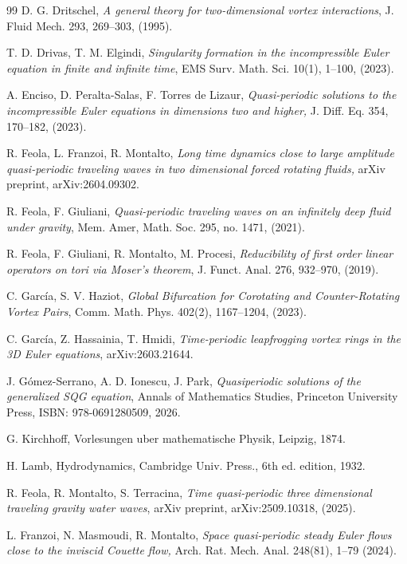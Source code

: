 \documentclass[a4paper,reqno,10pt]{article}
\begin{document}
\begin{thebibliography}{99}
    D. G. Dritschel, 
    {\it A general theory for two-dimensional vortex interactions},
    J. Fluid Mech. 293, 269--303, (1995).

    T. D. Drivas, T. M. Elgindi,
    {\it Singularity formation in the incompressible Euler equation in finite and infinite time}, 
    EMS Surv. Math. Sci. 10(1), 1--100, (2023).

      A. Enciso, D. Peralta-Salas, F. Torres de Lizaur, \textit{Quasi-periodic solutions to the incompressible Euler equations in dimensions two and higher,} 
     J.  Diff. Eq. 354, 170--182, (2023).

     R. Feola, L. Franzoi, R. Montalto, 
     \textit{Long time dynamics close to large amplitude quasi-periodic traveling waves in two dimensional forced rotating fluids,} 
     arXiv preprint,  arXiv:2604.09302.
	
	R. Feola, F.  Giuliani,
	{\it Quasi-periodic traveling waves on an infinitely deep fluid under gravity},
    Mem. Amer, Math. Soc. 295, no. 1471, (2021).
	
	
	R. Feola, F.  Giuliani, R.  Montalto, M. Procesi,
	{\it Reducibility of first order linear operators on tori via Moser's theorem},
	J. Funct. Anal. 276, 932--970, (2019).

    C. Garc\'ia, S. V. Haziot,
    \textit{Global Bifurcation for Corotating and Counter-Rotating Vortex Pairs},
    Comm. Math. Phys. 402(2), 1167--1204, (2023).

   C. Garc\'ia, Z. Hassainia, T. Hmidi, {\it Time-periodic leapfrogging vortex rings in the 3D Euler equations}, arXiv:2603.21644.
    
	 J. G\'omez-Serrano, A. D. Ionescu, J. Park, 
    {\it Quasiperiodic solutions of the generalized SQG equation}, 
    Annals of Mathematics Studies, Princeton University Press, 
    ISBN: 978-0691280509, 2026.


G. Kirchhoﬀ, 
Vorlesungen uber mathematische Physik, Leipzig, 1874.

H. Lamb, 
Hydrodynamics, 
Cambridge Univ. Press., 6th ed. edition, 1932.

	
	R. Feola, R. Montalto, S. Terracina, 
	{\it Time quasi-periodic three dimensional traveling gravity water waves},
	arXiv preprint, arXiv:2509.10318, (2025).

     L. Franzoi, N. Masmoudi, R. Montalto, 
     \textit{Space quasi-periodic steady Euler flows close to the inviscid Couette flow,} 
     Arch.  Rat. Mech. Anal. 248(81), 1--79 (2024).
	

\end{thebibliography}
\end{document}
